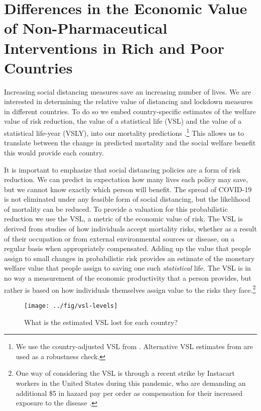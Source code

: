 \documentclass[11pt]{article}
\begin{document}
\section{Differences in the Economic Value of Non-Pharmaceutical Interventions in Rich and Poor Countries}
\label{sec:vsl}


Increasing social distancing measures save an increasing number of lives. We are interested in determining the relative value of distancing and lockdown measures in different countries. To do so we embed country-specific estimates of the welfare value of risk reduction, the value of a statistical life (VSL) and the value of a statistical life-year (VSLY), into our mortality predictions \parencite{viscusi2017,robinson2019}.\footnote{We use the country-adjusted VSL from \textcite{viscusi2017}. Alternative VSL estimates from \textcite{robinson2019} are used as a robustness check.} This allows us to translate between the change in predicted mortality and the social welfare benefit this would provide each country.

It is important to emphasize that social distancing policies are a form of risk reduction. We can predict in expectation how many lives each policy may save, but we cannot know exactly which person will benefit. The spread of COVID-19 is not eliminated under any feasible form of social distancing, but the likelihood of mortality can be reduced. To provide a valuation for this probabilistic reduction we use the VSL, a metric of the economic value of risk. The VSL is derived from studies of how individuals  accept mortality risks, whether as a result of their occupation or from external environmental sources or disease, on a regular basis when appropriately compensated. Adding up the value that people assign to small changes in probabilistic risk provides an estimate of the monetary welfare value that people assign to saving one such \textit{statistical} life. The VSL is in no way a measurement of the economic productivity that a person provides, but rather is based on how individuals themselves assign value to the risks they face.\footnote{
	One way of considering the VSL is through a recent strike by Instacart workers in the United States during this pandemic, who are demanding an additional \$5 in hazard pay per order as compensation for their increased exposure to the disease \parencite{wapo2020}.}


\begin{figure}[htbp!]
\centering
\caption{What is the estimated VSL lost for each country?}
  \texttt{[image: ../fig/vsl-levels]}
\label{fig:vsl-levels}
\end{figure}
\end{document}
